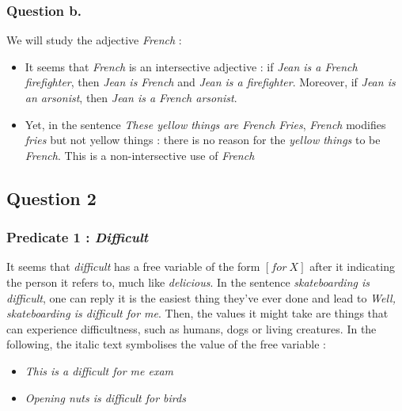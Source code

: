 \documentclass{cours}
\begin{document}
            \subsubsection{Question b.}
                We will study the adjective \textsl{French} :
                \begin{itemize}
                    \item It seems that \textsl{French} is an intersective adjective : if \textsl{Jean is a French firefighter}, then \textsl{Jean is French} and \textsl{Jean is a firefighter}. Moreover, if \textsl{Jean is an arsonist}, then \textsl{Jean is a French arsonist}. 
                    \item Yet, in the sentence \textsl{These yellow things are French Fries}, \textsl{French} modifies \textsl{fries} but not yellow things : there is no reason for the \textsl{yellow things} to be \textsl{French}. This is a non-intersective use of \textsl{French}
                \end{itemize}
        
                \subsection{Question 2}
                \subsubsection{Predicate 1 : \textsl{Difficult}}
                    It seems that \textsl{difficult} has a free variable of the form ${\left[for\ X\right]}$ after it indicating the person it refers to, much like \textsl{delicious}. In the sentence \textsl{skateboarding is difficult}, one can reply it is the easiest thing they've ever done and lead to \textsl{Well, skateboarding is difficult \textit{for me}}.
                    Then, the values it might take are things that can experience difficultness, such as humans, dogs or living creatures. In the following, the italic text symbolises the value of the free variable :
                    \begin{itemize}
                        \item \textsl{This is a difficult \textit{for me} exam}
                        \item \textsl{Opening nuts is difficult \textit{for birds}}
                    \end{itemize}
    
\end{document}
